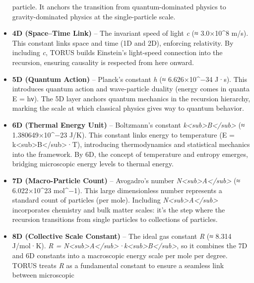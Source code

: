 \documentclass[
]{article}
\begin{document}
\begin{itemize}
  particle. It anchors the transition from quantum-dominated physics to
  gravity-dominated physics at the single-particle scale.
\item
  \textbf{4D (Space--Time Link)} -- The invariant speed of light
  \emph{c} (≈ 3.0×10\^{}8 m/s)\hspace{0pt}. This constant links space
  and time (1D and 2D), enforcing relativity. By including \emph{c},
  TORUS builds Einstein's light-speed connection into the recursion,
  ensuring causality is respected from here onward.
\item
  \textbf{5D (Quantum Action)} -- Planck's constant \emph{h} (≈
  6.626×10\^{}−34 J·s)\hspace{0pt}. This introduces quantum action and
  wave-particle duality (energy comes in quanta E = hν). The 5D layer
  anchors quantum mechanics in the recursion hierarchy, marking the
  scale at which classical physics gives way to quantum behavior.
\item
  \textbf{6D (Thermal Energy Unit)} -- Boltzmann's constant
  \emph{k\textless sub\textgreater B\textless/sub\textgreater{}} (≈
  1.380649×10\^{}−23 J/K)\hspace{0pt}. This constant links energy to
  temperature (E =
  k\textless sub\textgreater B\textless/sub\textgreater·T), introducing
  thermodynamics and statistical mechanics into the framework. By 6D,
  the concept of temperature and entropy emerges, bridging microscopic
  energy levels to thermal energy.
\item
  \textbf{7D (Macro-Particle Count)} -- Avogadro's number
  \emph{N\textless sub\textgreater A\textless/sub\textgreater{}} (≈
  6.022×10\^{}23 mol\^{}−1)\hspace{0pt}. This large dimensionless number
  represents a standard count of particles (per mole). Including
  \emph{N\textless sub\textgreater A\textless/sub\textgreater{}}
  incorporates chemistry and bulk matter scales: it's the step where the
  recursion transitions from single particles to collections of
  particles.
\item
  \textbf{8D (Collective Scale Constant)} -- The ideal gas constant
  \emph{R} (≈ 8.314 J/mol·K)\hspace{0pt}. \emph{R =
  N\textless sub\textgreater A\textless/sub\textgreater·k\textless sub\textgreater B\textless/sub\textgreater{}},
  so it combines the 7D and 6D constants into a macroscopic energy scale
  per mole per degree\hspace{0pt}. TORUS treats \emph{R} as a
  fundamental constant to ensure a seamless link between microscopic

\end{itemize}
\end{document}
